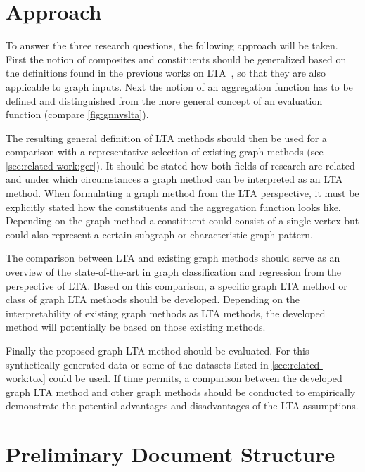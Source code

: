 \documentclass[12pt]{scrartcl}
\begin{document}
\section{Approach}%
\label{sec:approach}

To answer the three research questions, the following approach will be taken.
First the notion of composites and constituents should be generalized based on the definitions found in the previous works on LTA~\cite{Melnikov2016}\cite{Melnikov2019}, so that they are also applicable to graph inputs.
Next the notion of an aggregation function has to be defined and distinguished from the more general concept of an evaluation function (compare \cref{fig:gnnvslta}).

The resulting general definition of LTA methods should then be used for a comparison with a representative selection of existing graph methods (see \cref{sec:related-work:gcr}).
It should be stated how both fields of research are related and under which circumstances a graph method can be interpreted as an LTA method.
When formulating a graph method from the LTA perspective, it must be explicitly stated how the constituents and the aggregation function looks like.
Depending on the graph method a constituent could consist of a single vertex but could also represent a certain subgraph or characteristic graph pattern.

The comparison between LTA and existing graph methods should serve as an overview of the state-of-the-art in graph classification and regression from the perspective of LTA.\@
Based on this comparison, a specific graph LTA method or class of graph LTA methods should be developed.
Depending on the interpretability of existing graph methods as LTA methods, the developed method will potentially be based on those existing methods.

Finally the proposed graph LTA method should be evaluated.
For this synthetically generated data or some of the datasets listed in \cref{sec:related-work:tox} could be used.
If time permits, a comparison between the developed graph LTA method and other graph methods should be conducted to empirically demonstrate the potential advantages and disadvantages of the LTA assumptions.

\section{Preliminary Document Structure}%
\label{sec:doc-structure}
\end{document}
